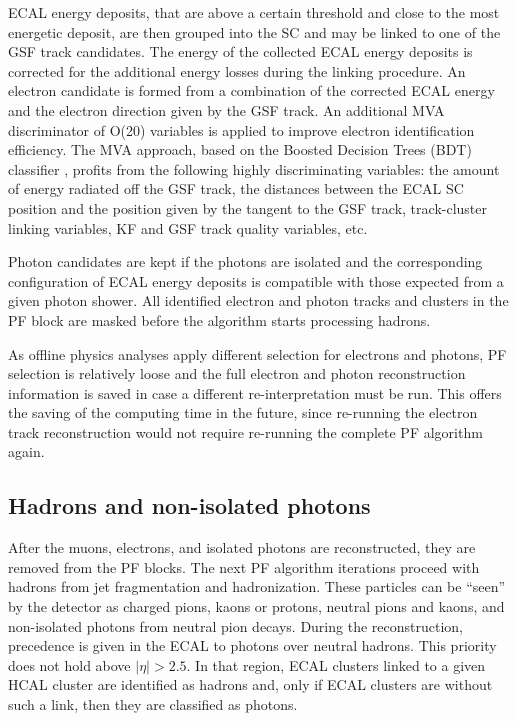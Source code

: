 ECAL energy deposits, that are above a certain threshold and close to the most energetic deposit, are then grouped into the SC and may be linked to one of the GSF track candidates. The energy of the collected ECAL energy deposits is corrected for the additional energy losses during the linking procedure. An electron candidate is formed from a combination of the corrected ECAL energy and the electron direction given by the GSF track. An additional MVA discriminator of O(20) variables is applied to improve electron identification efficiency. The MVA approach, based on the Boosted Decision Trees (BDT) classifier \cite{TMVA}, profits from the following highly discriminating variables: the amount of energy radiated off the GSF track, the distances between the ECAL SC position and the position given by the tangent to the GSF track, track-cluster linking variables, KF and GSF track quality variables, etc. 

Photon candidates are kept if the photons are isolated and the corresponding configuration of ECAL energy deposits is compatible with those expected from a given photon shower.  All identified electron and photon tracks and clusters in the PF block are masked before the algorithm starts processing hadrons. 

As offline physics analyses apply different selection for electrons and photons, PF selection is relatively loose and  the full electron and photon reconstruction information is saved in case a different re-interpretation must be run. This offers the saving of the computing time in the future, since re-running the electron track reconstruction would not require re-running the complete PF algorithm again.

\subsection{Hadrons and non-isolated photons}\label{sec:hadrons}

After the muons, electrons, and isolated photons are reconstructed, they are removed from the PF blocks. The next PF algorithm iterations proceed with hadrons from jet fragmentation and hadronization. These particles can be ``seen'' by the detector as charged pions, kaons or protons, neutral pions and kaons, and non-isolated photons from neutral pion decays. During the reconstruction, precedence is given in the ECAL to photons over neutral hadrons. This priority does not hold above $|\eta| > 2.5$. In that region, ECAL clusters linked to a given HCAL cluster are identified as hadrons and, only if ECAL clusters are without such a link, then they are classified as photons.  

